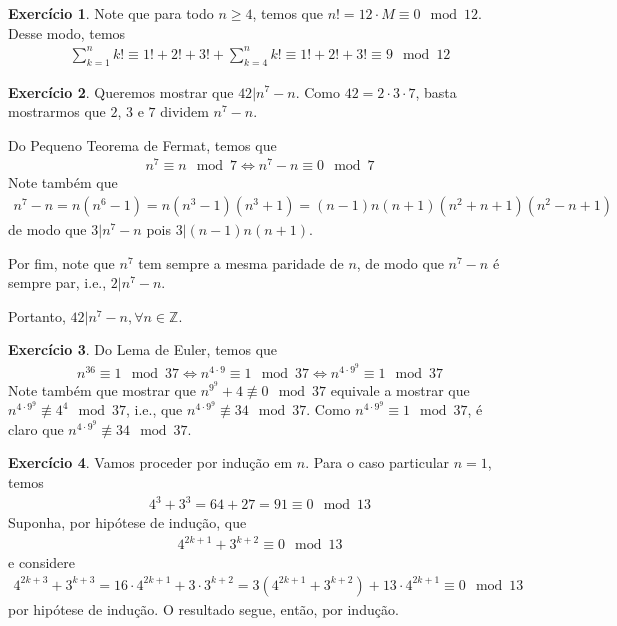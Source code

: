 \documentclass[a4paper,12pt]{article}
\theoremstyle{definition}
\newtheorem{exercise}{Exercício}%
\begin{document}
	\begin{exercise}
		Note que para todo $n\geq 4$, temos que $n! = 12\cdot M \equiv 0\mod 12$. Desse modo, temos
		\begin{align*}
		\sum_{k=1}^{n} k! \equiv 1! + 2! + 3! + \sum_{k=4}^{n}k! \equiv 1! + 2! + 3! \equiv 9\mod 12
		\end{align*}
	\end{exercise}
	\begin{exercise}
		Queremos mostrar que $42|n^7 - n$. Como $42 = 2\cdot 3\cdot 7$, basta mostrarmos que $2$, $3$ e $7$ dividem $n^7 - n$. 
		\par\vspace{0.3cm} Do Pequeno Teorema de Fermat, temos que
		\begin{align*}
		n^7 \equiv n\mod 7 \Leftrightarrow n^7 - n \equiv 0\mod 7 
		\end{align*}
		Note também que
		\begin{align*}
		n^7 - n = n(n^6 - 1) = n(n^3 - 1)(n^3+1) = (n-1)n(n+1)(n^2+n+1)(n^2-n+1)
		\end{align*}
		de modo que $3|n^7 - n$ pois $3|(n-1)n(n+1)$.
		\par\vspace{0.3cm} Por fim, note que $n^7$ tem sempre a mesma paridade de $n$, de modo que $n^7 - n$ é sempre par, i.e., $2|n^7 - n$.
		\par\vspace{0.3cm} Portanto, $42|n^7 - n, \forall n\in\mathbb{Z}$.
	\end{exercise}
	\begin{exercise}
		Do Lema de Euler, temos que 
		\begin{align*}
		n^{36} \equiv 1\mod 37 \Leftrightarrow n^{4\cdot 9} \equiv 1\mod 37 \Leftrightarrow n^{4\cdot 9^9}\equiv 1\mod 37
		\end{align*}
		Note também que mostrar que $n^{9^9} + 4\not\equiv 0\mod 37$ equivale a mostrar que $n^{4\cdot 9^9}\not\equiv 4^4\mod 37$, i.e., que $n^{4\cdot 9^9}\not\equiv 34\mod 37$. Como $n^{4\cdot 9^9} \equiv 1\mod 37$, é claro que $n^{4\cdot 9^9}\not\equiv 34\mod 37$.
	\end{exercise}
	\begin{exercise}
		Vamos proceder por indução em $n$. Para o caso particular $n=1$, temos
		\begin{align*}
		4^{3} + 3^3 = 64 + 27 = 91 \equiv 0\mod 13
		\end{align*}
		Suponha, por hipótese de indução, que
		\begin{align*}
		4^{2k + 1} + 3^{k+2}\equiv 0\mod 13
		\end{align*}
		e considere
		\begin{align*}
		4^{2k + 3} + 3^{k+3} = 16\cdot 4^{2k + 1} + 3\cdot 3^{k+2} = 3\left( 4^{2k + 1} + 3^{k+2} \right) + 13\cdot 4^{2k + 1} \equiv 0\mod 13
		\end{align*}
		por hipótese de indução. O resultado segue, então, por indução.
	\end{exercise}
\end{document}
